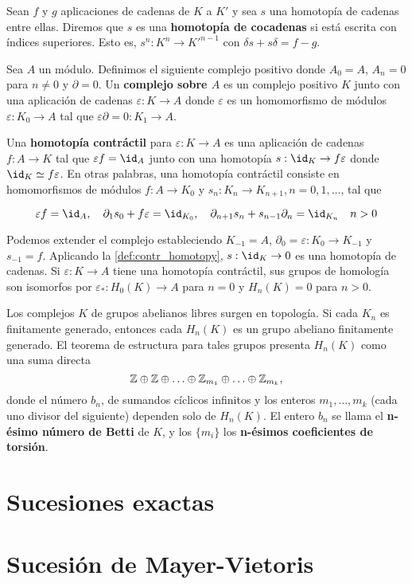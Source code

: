 \begin{definicion}
Sean $f$ y $g$ aplicaciones de cadenas de $K$ a $K'$ y sea $s$ una homotopía de cadenas entre ellas. Diremos que $s$ es una \textbf{homotopía de cocadenas} si  está escrita con índices superiores. Esto es, \( s^n: K^n \to K'^{n-1} \) con \( \delta s + s \delta = f - g \).
\end{definicion}

\begin{definicion}
	Sea $A$ un módulo. Definimos el siguiente complejo positivo donde \( A_0 = A \), \( A_n = 0 \) para \( n \neq 0 \) y \( \partial = 0 \). Un \textbf{complejo sobre \( A \)} es un complejo positivo \( K \) junto con una aplicación de cadenas \( \varepsilon: K \to A \) donde \( \varepsilon \) es un homomorfismo de módulos \( \varepsilon: K_0 \to A \) tal que \( \varepsilon \partial = 0: K_1 \to A \).
\end{definicion}

\begin{definicion}
\label{def:contr_homotopy}
Una \textbf{homotopía contráctil} para \( \varepsilon: K \to A \) es una aplicación de cadenas \( f: A \to K \) tal que \( \varepsilon f = \id_A \) junto con una homotopía \( s: \id_K \rightarrow f \varepsilon \) donde \( \id_K \simeq f \varepsilon \). En otras palabras, una homotopía contráctil consiste en homomorfismos de módulos \( f: A \to K_0 \) y \( s_n: K_n \to K_{n+1}, n = 0, 1, \dots \), tal que

\[ \varepsilon f = \id_A, \quad \partial_{1} s_0 + f \varepsilon = \id_{K_0}, \quad \partial_{n+1} s_n + s_{n-1} \partial_n = \id_{K_n} \quad n > 0 \]
\end{definicion}

Podemos extender el complejo estableciendo \( K_{-1} = A \), \( \partial_0 = \varepsilon: K_0 \to K_{-1} \) y \( s_{-1} = f \). Aplicando la \autoref{def:contr_homotopy}, \( s: \id_K \rightarrow 0 \) es una homotopía de cadenas. Si \( \varepsilon: K \to A \) tiene una homotopía contráctil, sus grupos de homología son isomorfos por \( \varepsilon_*: H_0(K) \rightarrow A \) para \( n = 0 \) y \( H_n(K) = 0 \) para \( n > 0 \).

Los complejos \( K \) de grupos abelianos libres surgen en topología. Si cada \( K_n \) es finitamente generado, entonces cada \( H_n(K) \) es un grupo abeliano finitamente generado. El teorema de estructura para tales grupos presenta \( H_n(K) \) como una suma directa
\[ \mathbb{Z} \oplus \mathbb{Z} \oplus \ldots \oplus \mathbb{Z}_{m_1} \oplus \ldots \oplus \mathbb{Z}_{m_k}, \]
donde el número \( b_n \), de sumandos cíclicos infinitos y los enteros \( m_1, \ldots, m_k \) (cada uno divisor del siguiente) dependen solo de \( H_n(K) \). El entero \( b_n \) se llama el \textbf{n-ésimo número de Betti} de \( K \), y los \( \{m_i\} \) los \textbf{n-ésimos coeficientes de torsión}.

\section{Sucesiones exactas}

\section{Sucesión de Mayer-Vietoris}

\endinput

